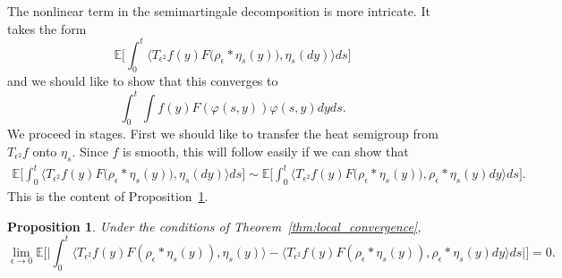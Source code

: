 \documentclass[12pt]{article}
\newtheorem{proposition}[theorem]{Proposition}
\newcommand{\IE}{\mathbb E}
\numberwithin{equation}{section}
\begin{document}
The nonlinear term in the semimartingale decomposition is more intricate. 
It takes the form
\[ %
\IE\Big[
\int_0^t\big\langle T_{\epsilon^2} f(y) F\big(\rho_\epsilon *\eta_s(y)\big), 
\eta_s(dy) \big\rangle ds\Big]
\]
and we should like to show that this converges to 
	\[
		\int_0^t\int f(y)F(\varphi(s,y))\varphi(s,y)dyds.
	\]
	We proceed in stages. First we should like to transfer the 
	heat semigroup from $T_{\epsilon^2}f$ onto $\eta_s$. 
	Since $f$ is smooth, this will follow easily if we can show that
\begin{align*}
\IE\Big[
\int_0^t\big\langle T_{\epsilon^2} f(y) F\big(\rho_\epsilon *\eta_s(y)\big), 
\eta_s(dy) \big\rangle ds\Big]
	\sim 
\IE\Big[
\int_0^t\big\langle T_{\epsilon^2} f(y) F\big(\rho_\epsilon * \eta_s(y)\big), 
\rho_\epsilon * \eta_s(y) dy \big\rangle ds\Big].
\end{align*}
This is the content of Proposition~\ref{CuadraticApprox}. 

\begin{proposition} 
\label{CuadraticApprox}
Under the conditions of Theorem~\ref{thm:local_convergence},
\begin{equation}
\label{replacing nonlinear term}
\lim_{\epsilon\to 0}\IE\Big[\Big|\int_0^t\big\langle T_{\epsilon^2} f(y) 
F(\rho_\epsilon *\eta_s(y)), \eta_s(y) \big\rangle 
- \big\langle T_{\epsilon^2} f(y) 
F(\rho_\epsilon * \eta_s(y)), \rho_\epsilon * \eta_s(y) dy 
\big\rangle ds \Big|\Big]
=0.
\end{equation}
\end{proposition}
\end{document}
